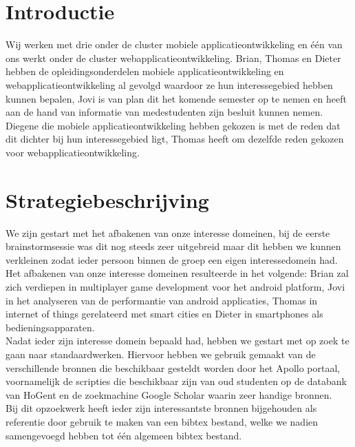 \documentclass[fleqn,10pt]{voorstel}
\begin{document}
\flushbottom %

\maketitle %

\tableofcontents %

\thispagestyle{empty} %


\section{Introductie} %
Wij werken met drie onder de cluster mobiele applicatieontwikkeling en één van ons werkt onder de cluster webapplicatieontwikkeling. Brian, Thomas en Dieter hebben de opleidingsonderdelen mobiele applicatieontwikkeling en webapplicatieontwikkeling
al gevolgd waardoor ze hun interessegebied hebben kunnen bepalen, Jovi is van plan dit het komende semester op te nemen en heeft aan de hand van informatie van medestudenten zijn besluit kunnen nemen.
Diegene die mobiele applicatieontwikkeling hebben gekozen is met de reden dat dit dichter bij hun interessegebied ligt, Thomas heeft om dezelfde reden gekozen voor webapplicatieontwikkeling.

\section{Strategiebeschrijving}
We zijn gestart met het afbakenen van onze interesse domeinen, bij de eerste brainstormsessie was dit nog steeds zeer uitgebreid maar dit hebben we kunnen verkleinen zodat ieder persoon binnen de groep een eigen interessedomein had. \\
Het afbakenen van onze interesse domeinen resulteerde in het volgende: Brian zal zich verdiepen in multiplayer game development voor het android platform, Jovi in het analyseren van de performantie van android applicaties, Thomas in internet of things gerelateerd met smart cities en Dieter in smartphones als bedieningsapparaten. \\
Nadat ieder zijn interesse domein bepaald had, hebben we gestart met op zoek te gaan naar standaardwerken. Hiervoor hebben we gebruik gemaakt van de verschillende bronnen die beschikbaar gesteldt worden door het Apollo portaal, voornamelijk de scripties die beschikbaar zijn van oud studenten op  de databank van HoGent en de zoekmachine Google Scholar waarin zeer handige bronnen. \\
Bij dit opzoekwerk heeft ieder zijn interessantste bronnen bijgehouden als referentie door gebruik te maken van een bibtex bestand, welke we nadien samengevoegd hebben tot één algemeen bibtex bestand.
\end{document}

